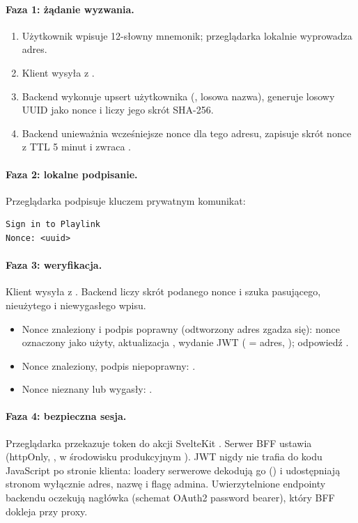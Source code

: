 \paragraph{Faza 1: żądanie wyzwania.}
\begin{enumerate}
  \item Użytkownik wpisuje 12-słowny mnemonik; przeglądarka lokalnie wyprowadza adres.
  \item Klient wysyła  z .
  \item Backend wykonuje upsert użytkownika (, losowa nazwa),
        generuje losowy UUID jako nonce i liczy jego skrót SHA-256.
  \item Backend unieważnia wcześniejsze nonce dla tego adresu, zapisuje skrót nonce z TTL
        5 minut i zwraca .
\end{enumerate}

\paragraph{Faza 2: lokalne podpisanie.}
Przeglądarka podpisuje kluczem prywatnym komunikat:

\begin{lstlisting}
Sign in to Playlink
Nonce: <uuid>
\end{lstlisting}

\paragraph{Faza 3: weryfikacja.}
Klient wysyła  z . Backend
liczy skrót podanego nonce i szuka pasującego, nieużytego i niewygasłego wpisu.
\begin{itemize}
  \item Nonce znaleziony i podpis poprawny (odtworzony adres zgadza się): nonce oznaczony
        jako użyty, aktualizacja , wydanie JWT ( = adres,
        ); odpowiedź .
  \item Nonce znaleziony, podpis niepoprawny: .
  \item Nonce nieznany lub wygasły: .
\end{itemize}

\paragraph{Faza 4: bezpieczna sesja.}
Przeglądarka przekazuje token do akcji SvelteKit . Serwer BFF
ustawia  (httpOnly, , w
środowisku produkcyjnym ). JWT nigdy nie trafia do kodu JavaScript po
stronie klienta: loadery serwerowe dekodują go () i udostępniają
stronom wyłącznie adres, nazwę i flagę admina. Uwierzytelnione endpointy backendu
oczekują nagłówka  (schemat OAuth2 password bearer),
który BFF dokleja przy proxy.

